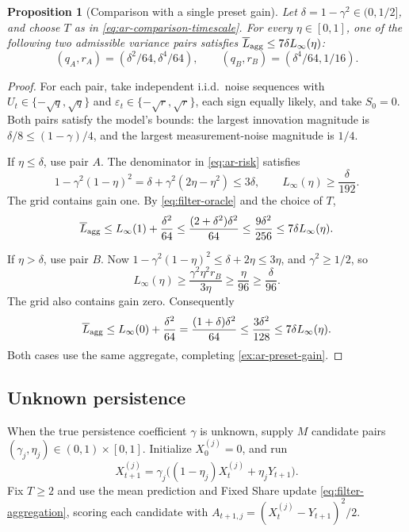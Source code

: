 \documentclass[11pt,twoside]{article}
\newtheorem{proposition}[theorem]{Proposition}
\theoremstyle{definition}
\theoremstyle{remark}
\begin{document}
\begin{proposition}[Comparison with a single preset gain]
Let $\delta=1-\gamma^2\in(0,1/2]$, and choose $T$ as in
\cref{eq:ar-comparison-timescale}. For every $\eta\in[0,1]$, one of the
following two admissible variance pairs satisfies
$\overline L_{\rm agg}\le7\delta L_\infty(\eta)$:
\[
 (q_A,r_A)=(\delta^2/64,\delta^4/64),\qquad
 (q_B,r_B)=(\delta^4/64,1/16).
\]
\end{proposition}
\begin{proof}
For each pair, take independent i.i.d.\ noise sequences with
$U_t\in\{-\sqrt q,\sqrt q\}$ and
$\varepsilon_t\in\{-\sqrt r,\sqrt r\}$, each sign equally likely,
and take $S_0=0$. Both pairs satisfy the model's bounds: the largest
innovation magnitude is
$\delta/8\le(1-\gamma)/4$, and the largest measurement-noise magnitude
is $1/4$.

If $\eta\le\delta$, use pair $A$. The denominator in
\cref{eq:ar-risk} satisfies
\[
 1-\gamma^2(1-\eta)^2
 =\delta+\gamma^2(2\eta-\eta^2)\le3\delta,
 \qquad L_\infty(\eta)\ge\frac{\delta}{192}.
\]
The grid contains gain one. By \cref{eq:filter-oracle} and the choice of
$T$,
\[
 \overline L_{\rm agg}
 \le L_\infty(1)+\frac{\delta^2}{64}
 \le\frac{(2+\delta^2)\delta^2}{64}
 \le\frac{9\delta^2}{256}
 \le7\delta L_\infty(\eta).
\]

If $\eta>\delta$, use pair $B$. Now
$1-\gamma^2(1-\eta)^2\le\delta+2\eta\le3\eta$, and
$\gamma^2\ge1/2$, so
\[
 L_\infty(\eta)
 \ge\frac{\gamma^2\eta^2r_B}{3\eta}
 \ge\frac{\eta}{96}\ge\frac{\delta}{96}.
\]
The grid also contains gain zero. Consequently
\[
 \overline L_{\rm agg}
 \le L_\infty(0)+\frac{\delta^2}{64}
 =\frac{(1+\delta)\delta^2}{64}
 \le\frac{3\delta^2}{128}
 \le7\delta L_\infty(\eta).
\]
Both cases use the same aggregate, completing
\cref{ex:ar-preset-gain}.
\end{proof}

\subsection{Unknown persistence}
\label{app:unknown-persistence}

When the true persistence coefficient $\gamma$ is unknown, supply $M$
candidate pairs $(\gamma_j,\eta_j)\in(0,1)\times[0,1]$. Initialize
$X_0^{(j)}=0$, and run
\[
 X_{t+1}^{(j)}
 =\gamma_j\bigl((1-\eta_j)X_t^{(j)}+\eta_jY_{t+1}\bigr).
\]
Fix $T\ge2$ and use the mean prediction and Fixed Share update
\cref{eq:filter-aggregation}, scoring each candidate with
$A_{t+1,j}=(X_t^{(j)}-Y_{t+1})^2/2$.
\end{document}
